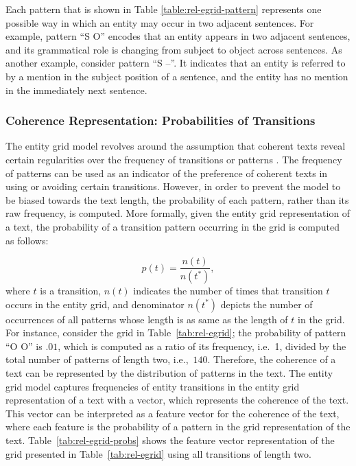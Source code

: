 Each pattern that is shown in Table \ref{table:rel-egrid-pattern} represents one possible way in which an entity may occur in two adjacent sentences. 
For example, pattern ``S O'' encodes that an entity appears in two adjacent sentences, and its grammatical role is changing from subject to object across sentences. 
As another example, consider pattern ``S --''. 
It indicates that an entity is referred to by a mention in the subject position of a sentence, and the entity has no mention in the immediately next sentence. 

\subsubsection{Coherence Representation: Probabilities of Transitions}
%
The entity grid model revolves around the assumption that coherent texts reveal certain regularities over the frequency of transitions or patterns \cite{barzilay05a,barzilay08}.    
The frequency of patterns can be used as an indicator of the preference of coherent texts in using or avoiding certain transitions. 
However, in order to prevent the model to be biased towards the text length, the probability of each pattern, rather than its raw frequency, is computed. 	 
More formally, given the entity grid representation of a text, the probability of a transition pattern occurring in the grid is computed as follows:

\begin{equation}
p(t) = \frac{n(t)}{n(t^*)},
\end{equation}
where $t$ is a transition, $n(t)$ indicates the number of times that transition $t$ occurs in the entity grid, and denominator $n(t^*)$ depicts the number of occurrences of all patterns whose length is as same as the length of $t$ in the grid. 
For instance, consider the grid in Table~\ref{tab:rel-egrid}; the probability of pattern ``O O'' is $.01$, which is computed as a ratio of its frequency, i.e.\ 1, divided by the total number of patterns of length two, i.e.,\ $140$.    
Therefore, the coherence of a text can be represented by the distribution of patterns in the text. 
The entity grid model captures frequencies of entity transitions in the entity grid representation of a text with a vector, which represents the coherence of the text. 
This vector can be interpreted as a feature vector for the coherence of the text, where each feature is the probability of a pattern in the grid representation of the text.  
Table~\ref{tab:rel-egrid-probs} shows the feature vector representation of the grid presented in Table~\ref{tab:rel-egrid} using all transitions of length two. 

